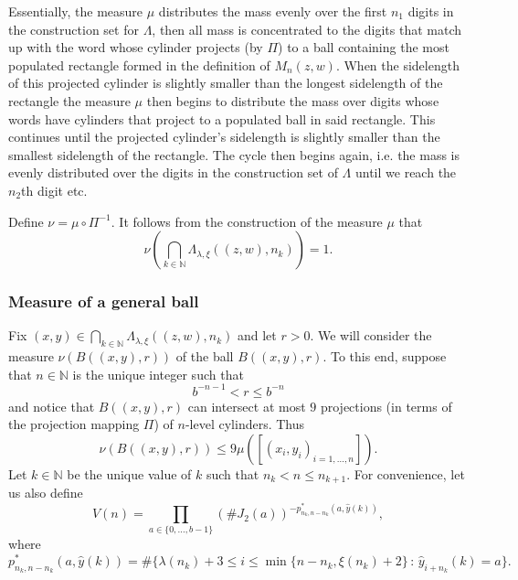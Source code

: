 \documentclass[12pt]{article}
\theoremstyle{remark}
\numberwithin{equation}{section}
\renewcommand{\Bbb}[1]{\mathbb{#1}}
\newcommand{\N}{{\Bbb N}}         %
\newcommand{\0}{\mathbf{0}}
\begin{document}
Essentially, the measure $\mu$ distributes the mass evenly over the first $n_{1}$ digits in the construction set for $\Lambda$, then all mass is concentrated to the digits that match up with the word whose cylinder projects (by $\Pi$) to a ball containing the most populated rectangle formed in the definition of $M_{n}(z,w)$. When the sidelength of this projected cylinder is slightly smaller than the longest sidelength of the rectangle the measure $\mu$ then begins to distribute the mass over digits whose words have cylinders that project to a populated ball in said rectangle. This continues until the projected cylinder's sidelength is slightly smaller than the smallest sidelength of the rectangle. The cycle then begins again, i.e. the mass is evenly distributed over the digits in the construction set of $\Lambda$ until we reach the $n_{2}$th digit etc.  \par 
 Define $\nu=\mu \circ \Pi^{-1}$. It follows from the construction of the measure $\mu$ that
 \begin{equation*}
     \nu\left( \bigcap_{k\in \N}\Lambda_{\lambda,\xi}((z,w), n_{k}) \right)=1.
 \end{equation*}
 
 \subsubsection{Measure of a general ball}
 Fix $(x,y) \in \bigcap_{k \in \N}\Lambda_{\lambda,\xi}((z,w),n_{k})$ and let $r>0$. We will consider the measure $\nu(B((x,y),r))$ of the ball $B((x,y),r)$. To this end, suppose that $n \in \N$ is the unique integer such that
 \begin{equation*}
     b^{-n-1}<r \leq b^{-n}
 \end{equation*}
and notice that $B((x,y),r)$ can intersect at most $9$ projections (in terms of the projection mapping $\Pi$) of $n$-level cylinders. Thus 
 \begin{equation*}
     \nu(B((x,y),r)) \leq 9 \mu([(x_{i},y_{i})_{i=1, \dots , n}]).
 \end{equation*}
Let $k \in \N$ be the unique value of $k$ such that $n_{k}<n\leq n_{k+1}$. For convenience, let us also define
 \begin{equation*}
     V(n) = \prod_{a \in \{0, \dots , b-1\}}(\#J_{2}(a))^{-p^{*}_{n_{k},n-n_{k}}(a,\hat{y}(k))},
 \end{equation*}
 where
 \begin{equation*}
 p^{*}_{n_{k},n-n_{k}}(a,\hat{y}(k))=\#\{\lambda(n_k) +3 \leq i \leq \min\{n-n_k,\xi(n_k)+2\} \, : \, \hat{y}_{i+n_k}(k)=a\}.
 \end{equation*}
\end{document}
